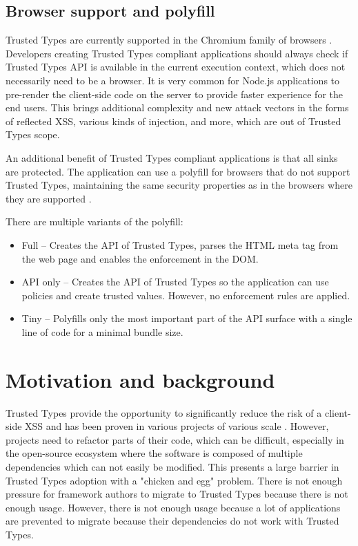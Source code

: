 \subsection{Browser support and polyfill}

Trusted Types are currently supported in the Chromium family of browsers
\cite{mdn:tt_compatibility}. Developers creating Trusted Types compliant applications should always
check if Trusted Types API is available in the current execution context, which does not necessarily
need to be a browser. It is very common for Node.js applications to pre-render the client-side code
on the server to provide faster experience for the end users. This brings additional complexity and
new attack vectors in the forms of reflected XSS, various kinds of injection, and more, which are
out of Trusted Types scope.

An additional benefit of Trusted Types compliant applications is that all sinks are protected. The
application can use a polyfill for browsers that do not support Trusted Types, maintaining the same
security properties as in the browsers where they are supported \cite{xss_nowhere_with_polyfill}.

There are multiple variants of the polyfill:

\begin{itemize}
  \item Full -- Creates the API of Trusted Types, parses the HTML meta tag from the web page
        and enables the enforcement in the DOM.
  \item API only -- Creates the API of Trusted Types so the application can use policies and create
        trusted values. However, no enforcement rules are applied.
  \item Tiny -- Polyfills only the most important part of the API surface with a single line of code
        for a minimal bundle size.
\end{itemize}

\section{Motivation and background}

Trusted Types provide the opportunity to significantly reduce the risk of a client-side XSS and has
been proven in various projects of various scale \cite{tt_web_framework_paper}
\cite{tt_integration_list}. However, projects need to refactor parts of their code, which can be
difficult, especially in the open-source ecosystem where the software is composed of multiple
dependencies which can not easily be modified. This presents a large barrier in Trusted Types
adoption \cite{tt_web_framework_paper} with a "chicken and egg" problem. There is not enough
pressure for framework authors to migrate to Trusted Types because there is not enough usage.
However, there is not enough usage because a lot of applications are prevented to migrate because
their dependencies do not work with Trusted Types.

